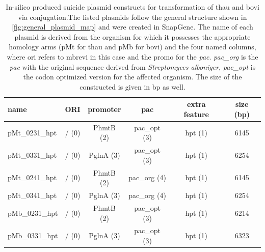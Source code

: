 \begin{table}[ht]
\centering
\caption[In-silico produced suicide plasmid constructs for transformation of \acrlong{thau} and \acrlong{bovi} via conjugation.]{In-silico produced suicide plasmid constructs for transformation of \acrlong{thau} and \acrlong{bovi} via conjugation.The listed plasmids follow the general structure shown in \cref{fig:general_plasmid_map} and were created in SnapGene. The name of each plasmid is derived from the organism for which it possesses the appropriate homology arms (pMt for \acrshort{thau} and pMb for \acrshort{bovi}) and the four named columns, where \gls{ori} refers to \acrshort{mbrevi} in this case and the \gls{promo} for the \textit{pac}. \textit{pac\_org} is the \textit{pac} with the original sequence derived from \textit{Streptomyces alboniger}, \textit{pac\_opt} is the codon optimized version for the affected organism. The size of the constructed is given in bp as well.} 
\label{tab:plasmid_konstrukte}
\begin{tabular}{lccccc}
  \toprule
name & ORI & promoter & pac & extra feature & size (bp) \\ 
  \midrule
  pMt\_0231\_hpt & / (0) & PhmtB (2) & pac\_opt (3) & hpt (1) & 6145 \\ 
  pMt\_0331\_hpt & / (0) & PglnA (3) & pac\_opt (3) & hpt (1) & 6254\\ 
  pMt\_0241\_hpt & / (0) & PhmtB (2) & pac\_org (4) & hpt (1) & 6145 \\ 
  pMt\_0341\_hpt & / (0) & PglnA (3) & pac\_org (4) & hpt (1)  & 6254 \\ 
  pMb\_0231\_hpt & / (0) & PhmtB (2) & pac\_opt (3) & hpt (1) & 6214 \\ 
  pMb\_0331\_hpt & / (0) & PglnA (3) & pac\_opt (3) & hpt (1) & 6323 \\ 
   \bottomrule
\end{tabular}
\end{table}
